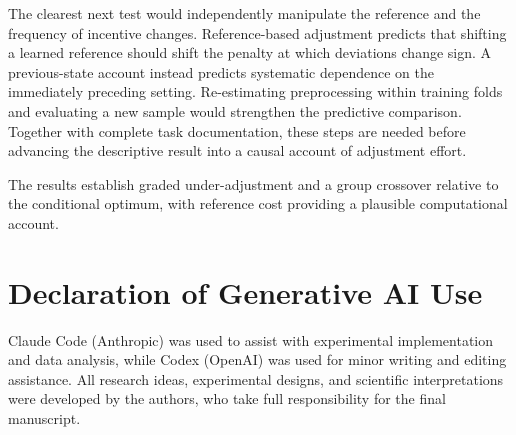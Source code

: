 \documentclass[10pt,letterpaper]{article}
\begin{document}
The clearest next test would independently manipulate the reference and the frequency of incentive changes. Reference-based adjustment predicts that shifting a learned reference should shift the penalty at which deviations change sign. A previous-state account instead predicts systematic dependence on the immediately preceding setting. Re-estimating preprocessing within training folds and evaluating a new sample would strengthen the predictive comparison. Together with complete task documentation, these steps are needed before advancing the descriptive result into a causal account of adjustment effort.

The results establish graded under-adjustment and a group crossover relative to the conditional optimum, with reference cost providing a plausible computational account.

\clearpage
\section{Declaration of Generative AI Use}
Claude Code (Anthropic) was used to assist with experimental implementation and data analysis, while Codex (OpenAI) was used for minor writing and editing assistance. All research ideas, experimental designs, and scientific interpretations were developed by the authors, who take full responsibility for the final manuscript.

\printbibliography
\end{document}
